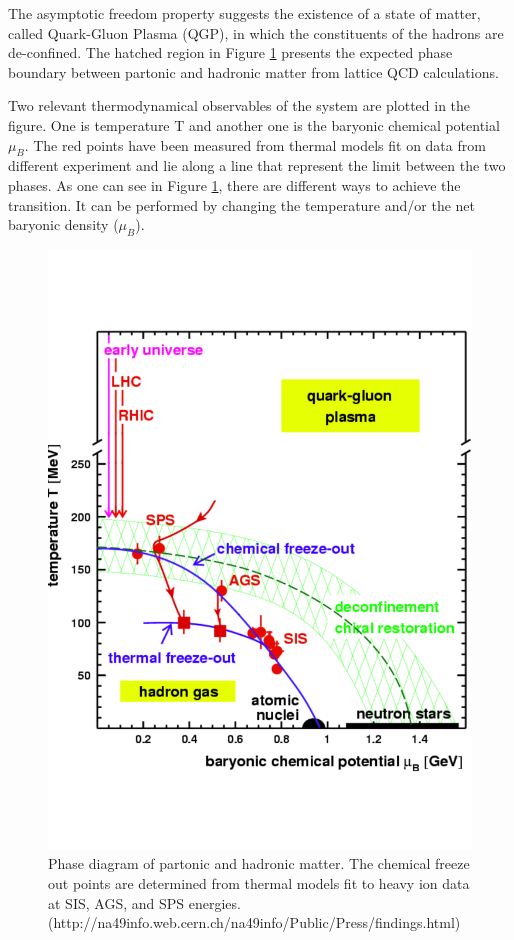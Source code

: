 The asymptotic freedom property suggests the existence of a state of matter, called Quark-Gluon Plasma (QGP), in which the constituents of the hadrons are de-confined. The hatched region in Figure \ref{fig:phase} presents the expected phase boundary between partonic and hadronic matter from lattice QCD calculations. 

Two relevant thermodynamical observables of the system are plotted in the figure. One is temperature T and another one is the baryonic chemical potential $\mu_{B}$. The red points have been measured from thermal models fit on data from different experiment \cite{cite:thermal_pbm} and lie along a line that represent the limit between the two phases. As one can see in Figure \ref{fig:phase}, there are different ways to achieve the transition. It can be performed by changing the temperature and/or the net baryonic density ($\mu_{B}$). 

\begin{figure}[htbp]
\begin{center}
\includegraphics[width=12.cm]{./Version1/FigChapter1/PhaseDiagram}
\caption{Phase diagram of partonic and hadronic matter. The chemical freeze out points are determined from thermal models fit to heavy ion data at SIS, AGS, and SPS energies. (http://na49info.web.cern.ch/na49info/Public/Press/findings.html)}
\label{fig:phase}
\end{center}
\end{figure}


